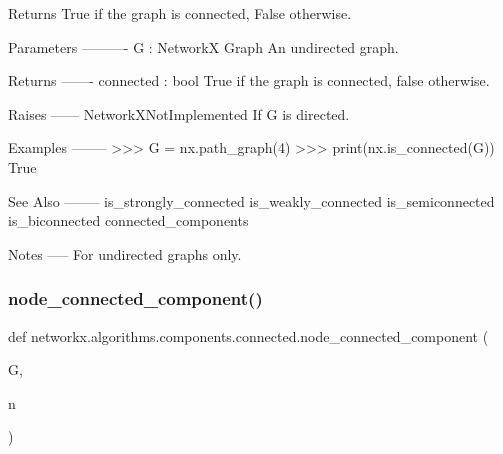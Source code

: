 \begin{DoxyVerb}Returns True if the graph is connected, False otherwise.

Parameters
----------
G : NetworkX Graph
   An undirected graph.

Returns
-------
connected : bool
  True if the graph is connected, false otherwise.

Raises
------
NetworkXNotImplemented
    If G is directed.

Examples
--------
>>> G = nx.path_graph(4)
>>> print(nx.is_connected(G))
True

See Also
--------
is_strongly_connected
is_weakly_connected
is_semiconnected
is_biconnected
connected_components

Notes
-----
For undirected graphs only.\end{DoxyVerb}
 \mbox{\label{namespacenetworkx_1_1algorithms_1_1components_1_1connected_aae266adc38aec6076628b3d894ae63cb}} 
\subsubsection{\texorpdfstring{node\+\_\+connected\+\_\+component()}{node\_connected\_component()}}
{\footnotesize\ttfamily def networkx.\+algorithms.\+components.\+connected.\+node\+\_\+connected\+\_\+component (\begin{DoxyParamCaption}\item[{}]{G,  }\item[{}]{n }\end{DoxyParamCaption})}

